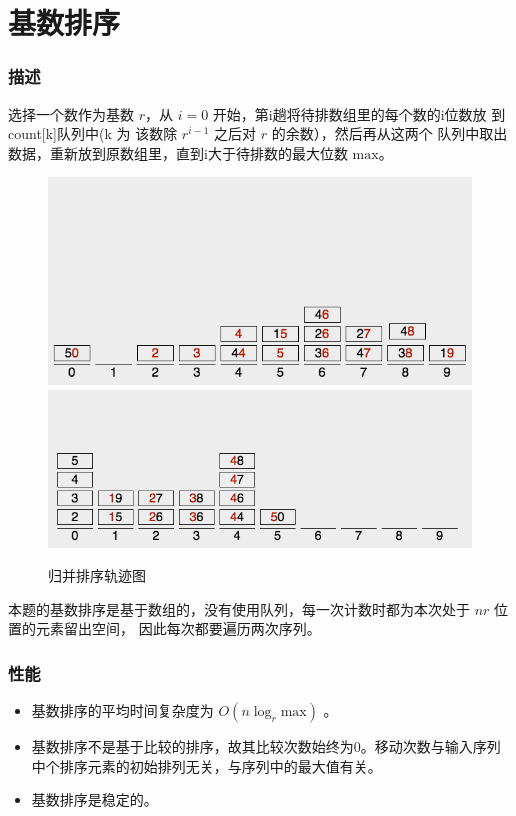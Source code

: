\section{基数排序}

\subsubsection{描述}

选择一个数作为基数 $r$，从 $i = 0$ 开始，第i趟将待排数组里的每个数的i位数放%
到count[k]队列中(k 为 该数除 $r^{i-1}$ 之后对 $r$ 的余数），然后再从这两个%
队列中取出数据，重新放到原数组里，直到i大于待排数的最大位数 $\text{max}$。

\begin{figure}[H]
    \centering
    \includegraphics[width=12.5cm]{src/radix1.png}
    \includegraphics[width=12.5cm]{src/radix10.png}
    \caption{归并排序轨迹图}
\end{figure}

本题的基数排序是基于数组的，没有使用队列，每一次计数时都为本次处于 $nr$ 位置的元素留出空间，%
因此每次都要遍历两次序列。

\subsubsection{性能}
\begin{itemize}
    \item 基数排序的平均时间复杂度为 $O(n\log_r{\text{max}})$ 。
    \item 基数排序不是基于比较的排序，故其比较次数始终为0。移动次数与输入序列中个排序元素的初始排列无关，与序列中的最大值有关。  
    \item 基数排序是稳定的。
\end{itemize}

